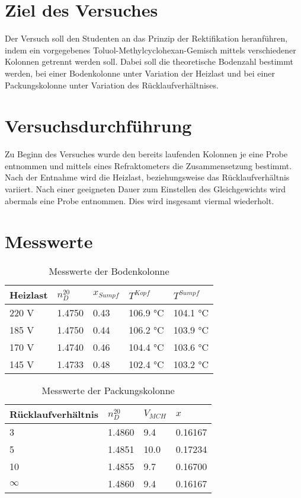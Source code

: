 \documentclass{article}
\begin{document}
%
%

\noindent
\section{Ziel des Versuches}
Der Versuch soll den Studenten an das Prinzip der Rektifikation heranführen, indem ein
vorgegebenes Toluol-Methylcyclohexan-Gemisch mittels verschiedener Kolonnen getrennt
werden soll. Dabei soll die theoretische Bodenzahl bestimmt werden, bei einer
Bodenkolonne unter Variation der Heizlast und bei einer Packungskolonne unter Variation
des Rücklaufverhältnises.
\section{Versuchsdurchführung}
Zu Beginn des Versuches wurde den bereits laufenden Kolonnen je eine Probe entnommen
und mittels eines Refraktometers die Zusammensetzung bestimmt. Nach der Entnahme wird
die Heizlast, beziehungsweise das Rücklaufverhältnis variiert. Nach einer geeigneten Dauer
zum Einstellen des Gleichgewichts wird abermals eine Probe entnommen. Dies wird
insgesamt viermal wiederholt.
\section{Messwerte}
\begin{table}[ht!]
  \centering
 \begin{tabularx}{\textwidth}{XXXXX}
Heizlast & $n^{20}_D$ & $x_{Sumpf}$ & $T^{Kopf}$ & $T^{Sumpf}$  \\
\hline
\rowcolor{LightCyan}
220 V & 1.4750 & 0.43 & 106.9 \si\celsius & 104.1 \si\celsius    \\
185 V & 1.4750 & 0.44 & 106.2 \si\celsius & 103.9 \si\celsius    \\
\rowcolor{LightCyan}
170 V & 1.4740 & 0.46 & 104.4 \si\celsius & 103.6 \si\celsius    \\
145 V & 1.4733 & 0.48 & 102.4 \si\celsius & 103.2 \si\celsius    \\
\end{tabularx}
  \caption{Messwerte der Bodenkolonne}

\end{table}

\begin{table}[ht!]
  \centering
 \begin{tabularx}{\textwidth}{XXXX}
Rücklaufverhältnis & $n^{20}_D$ & $V_{MCH}$ & $x$  \\
\hline
\rowcolor{LightCyan}
3 & 1.4860 & 9.4 &  0.16167   \\
5  & 1.4851 & 10.0 &  0.17234   \\
\rowcolor{LightCyan}
10  & 1.4855 & 9.7 & 0.16700   \\
$\infty$  & 1.4860 & 9.4 &  0.16167  \\
\end{tabularx}
  \caption{Messwerte der Packungskolonne}
\end{table}
\end{document}
